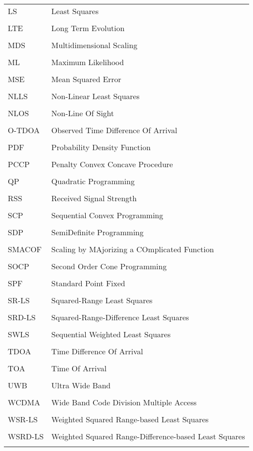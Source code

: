 \begin{longtable}[h]{l l}
\\
LS & Least Squares \\
\\
LTE & Long Term Evolution \\
\\
MDS & Multidimensional Scaling \\ 
\\
ML & Maximum Likelihood \\
\\
MSE & Mean Squared Error\\
\\
NLLS & Non-Linear Least Squares \\
\\
NLOS & Non-Line Of Sight \\
\\
O-TDOA & Observed Time Difference Of Arrival\\
\\
PDF & Probability Density Function \\
\\
PCCP & Penalty Convex Concave Procedure \\
\\
QP & Quadratic Programming \\
\\
RSS & Received Signal Strength \\
\\
SCP & Sequential Convex Programming \\
\\
SDP & SemiDefinite Programming \\
\\
SMACOF & Scaling by MAjorizing a COmplicated Function \\
\\
SOCP & Second Order Cone Programming \\
\\
SPF & Standard  Point Fixed\\
\\
SR-LS  & Squared-Range Least Squares \\
\\
SRD-LS & Squared-Range-Difference Least Squares \\
\\
SWLS & Sequential Weighted Least Squares \\
\\
TDOA &  Time Difference Of Arrival \\
\\
TOA & Time Of Arrival \\
\\
UWB & Ultra Wide Band \\
\\
WCDMA & Wide Band Code Division Multiple Access \\
\\
WSR-LS & Weighted Squared Range-based Least Squares \\
\\
WSRD-LS & Weighted Squared Range-Difference-based Least Squares \\
\\
\end{longtable}
